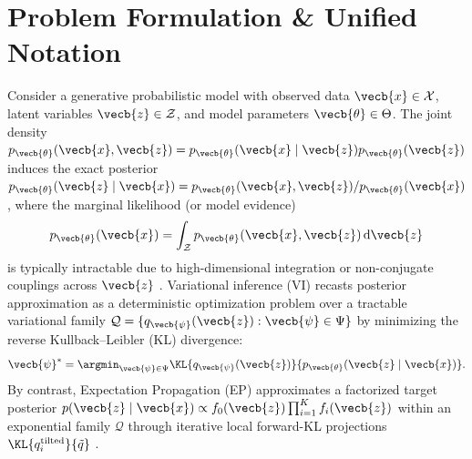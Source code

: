 \documentclass[../../../../master.tex]{subfiles}
\begin{document}

\section{Problem Formulation \& Unified Notation}

Consider a generative probabilistic model with observed data $\vecb{x} \in \mathcal{X}$, latent variables $\vecb{z} \in \mathcal{Z}$, and model parameters $\vecb{\theta} \in \Theta$. The joint density $p_{\vecb{\theta}}(\vecb{x}, \vecb{z}) = p_{\vecb{\theta}}(\vecb{x} \mid \vecb{z}) p_{\vecb{\theta}}(\vecb{z})$ induces the exact posterior $p_{\vecb{\theta}}(\vecb{z} \mid \vecb{x}) = p_{\vecb{\theta}}(\vecb{x}, \vecb{z}) / p_{\vecb{\theta}}(\vecb{x})$, where the marginal likelihood (or model evidence)
\begin{equation}
  p_{\vecb{\theta}}(\vecb{x}) = \int_{\mathcal{Z}} p_{\vecb{\theta}}(\vecb{x}, \vecb{z})\,\mathrm{d}\vecb{z}
  \label{eq:vi:evidence}
\end{equation}
is typically intractable due to high-dimensional integration or non-conjugate couplings across $\vecb{z}$ . Variational inference (VI) recasts posterior approximation as a deterministic optimization problem over a tractable variational family $\mathcal{Q} = \{ q_{\vecb{\psi}}(\vecb{z}) : \vecb{\psi} \in \Psi \}$ by minimizing the reverse Kullback--Leibler (KL) divergence:
\begin{equation}
  \vecb{\psi}^* = \argmin_{\vecb{\psi} \in \Psi} \KL{q_{\vecb{\psi}}(\vecb{z})}{p_{\vecb{\theta}}(\vecb{z} \mid \vecb{x})}.
  \label{eq:vi:reverse-kl-obj}
\end{equation}
By contrast, Expectation Propagation (EP) approximates a factorized target posterior $p(\vecb{z} \mid \vecb{x}) \propto f_0(\vecb{z}) \prod_{i=1}^K f_i(\vecb{z})$ within an exponential family $\mathcal{Q}$ through iterative local forward-KL projections $\KL{q_i^{\mathrm{tilted}}}{\tilde{q}}$ .
\end{document}
